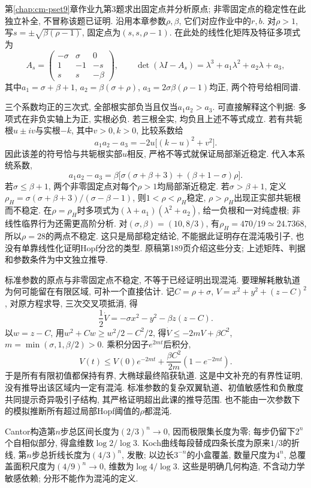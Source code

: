 第\ref{chap:cm-pset9}章作业九第3题求出固定点并分析原点; 非零固定点的稳定性在此独立补全, 不冒称该题已证明. 沿用本章参数$\rho,\beta$, 它们对应作业中的$r,b$. 对$\rho>1$, 写$s=\pm\sqrt{\beta(\rho-1)}$, 固定点为$(s,s,\rho-1)$. 在此处的线性化矩阵及特征多项式为
\[
A_s=\begin{pmatrix}-\sigma&\sigma&0\\1&-1&-s\\s&s&-\beta\end{pmatrix},\qquad
\det(\lambda I-A_s)=\lambda^3+a_1\lambda^2+a_2\lambda+a_3,
\]
其中$a_1=\sigma+\beta+1$, $a_2=\beta(\sigma+\rho)$, $a_3=2\sigma\beta(\rho-1)$均正, 两个符号给相同谱.

三个系数均正的三次式, 全部根实部负当且仅当$a_1a_2>a_3$. 可直接解释这个判据: 多项式在非负实轴上为正, 实根必负. 若三根全实, 均负且上述不等式成立. 若有共轭根$u\pm iv$与实根$-k$, 其中$v>0,k>0$, 比较系数给
\[
a_1a_2-a_3=-2u\bigl[(k-u)^2+v^2\bigr].
\]
因此该差的符号恰与共轭根实部$u$相反, 严格不等式就保证局部渐近稳定. 代入本系统系数,
\[
a_1a_2-a_3=\beta\bigl[\sigma(\sigma+\beta+3)+(\beta+1-\sigma)\rho\bigr].
\]
若$\sigma\le\beta+1$, 两个非零固定点对每个$\rho>1$均局部渐近稳定. 若$\sigma>\beta+1$, 定义$\rho_H=\sigma(\sigma+\beta+3)/(\sigma-\beta-1)$, 则$1<\rho<\rho_H$稳定, $\rho>\rho_H$出现正实部共轭根而不稳定. 在$\rho=\rho_H$时多项式为$(\lambda+a_1)(\lambda^2+a_2)$, 给一负根和一对纯虚根; 非线性临界行为还需更高阶分析. 对$(\sigma,\beta)=(10,8/3)$, 有$\rho_H=470/19\simeq24.7368$, 所以$\rho=28$的两点不稳定. 这只是局部稳定结论, 不能据此证明存在混沌吸引子, 也没有单靠线性化证明Hopf分岔的类型. 原稿第189页介绍这些分支; 上述矩阵、判据和参数条件为中文独立推导.

标准参数的原点与非零固定点不稳定, 不等于已经证明出现混沌. 要理解耗散轨道为何可能留在有限区域, 可补一个直接估计. 记$C=\rho+\sigma$, $V=x^2+y^2+(z-C)^2$, 对原方程求导, 三次交叉项抵消, 得
\[
\frac12\dot V=-\sigma x^2-y^2-\beta z(z-C).
\]
以$w=z-C$, 用$w^2+Cw\ge w^2/2-C^2/2$, 得$\dot V\le-2mV+\beta C^2$, $m=\min(\sigma,1,\beta/2)>0$. 乘积分因子$e^{2mt}$后积分,
\[
V(t)\le V(0)e^{-2mt}
 +\frac{\beta C^2}{2m}(1-e^{-2mt}).
\]
于是所有有限初值都保持有界, 大椭球最终陷获轨道. 这是中文补充的有界性证明, 没有推导出该区域内一定有混沌. 标准参数的复杂双翼轨道、初值敏感性和负散度共同提示奇异吸引子结构, 其严格证明超出此课的推导范围. 也不能由一次参数下的模拟推断所有超过局部Hopf阈值的$\rho$都混沌.

Cantor构造第$n$步总区间长度为$(2/3)^n\to0$, 因而极限集长度为零; 每步仍留下$2^n$个自相似部分, 得盒维数$\log2/\log3$. Koch曲线每段替成四条长度为原来$1/3$的折线, 第$n$步总折线长度为$(4/3)^n$, 发散; 以边长$3^{-n}$的小盒覆盖, 数量尺度为$4^n$, 总覆盖面积尺度为$(4/9)^n\to0$, 维数为$\log4/\log3$. 这些是明确几何构造, 不含动力学敏感依赖; 分形不能作为混沌的定义.

